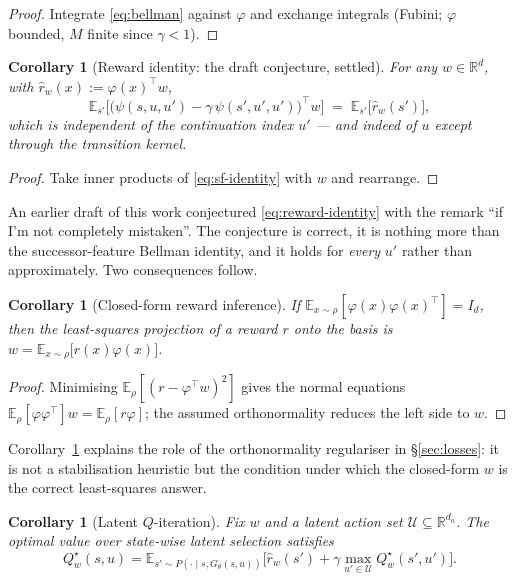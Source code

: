 \documentclass[11pt]{article}
\theoremstyle{plain}
\newtheorem{corollary}[lemma]{Corollary}
\theoremstyle{definition}
\theoremstyle{remark}
\newcommand{\R}{\mathbb R}
\newcommand{\E}{\mathbb E}
\newcommand{\1}{\mathbf 1}
\newcommand{\Gth}{G_\theta}
\begin{document}
\begin{proof}
Integrate \eqref{eq:bellman} against $\varphi$ and exchange integrals (Fubini; $\varphi$
bounded, $M$ finite since $\gamma<1$).
\end{proof}

\begin{corollary}[Reward identity: the draft conjecture, settled]
\label{cor:reward-identity}
For any $w\in\R^{d}$, with $\hat r_w(x):=\varphi(x)^\top w$,
\begin{equation}
\label{eq:reward-identity}
  \E_{s'}\Big[\big(\psi(s,u,u')-\gamma\,\psi(s',u',u')\big)^\top w\Big]
  \;=\;\E_{s'}\big[\hat r_w(s')\big],
\end{equation}
which is independent of the continuation index $u'$ --- and indeed of $u$ except through
the transition kernel.
\end{corollary}

\begin{proof}
Take inner products of \eqref{eq:sf-identity} with $w$ and rearrange.
\end{proof}

\noindent
An earlier draft of this work conjectured \eqref{eq:reward-identity} with the remark ``if
I'm not completely mistaken''. The conjecture is correct, it is nothing more than the
successor-feature Bellman identity, and it holds for \emph{every} $u'$ rather than
approximately. Two consequences follow.

\begin{corollary}[Closed-form reward inference]
\label{cor:reward-inference}
If $\E_{x\sim\rho}[\varphi(x)\varphi(x)^\top]=I_d$, then the least-squares projection of a
reward $r$ onto the basis is $w=\E_{x\sim\rho}\big[r(x)\varphi(x)\big]$.
\end{corollary}

\begin{proof}
Minimising $\E_\rho[(r-\varphi^\top w)^2]$ gives the normal equations
$\E_\rho[\varphi\varphi^\top]w=\E_\rho[r\varphi]$; the assumed orthonormality reduces the
left side to $w$.
\end{proof}

\noindent
Corollary~\ref{cor:reward-inference} explains the role of the orthonormality regulariser
in \S\ref{sec:losses}: it is not a stabilisation heuristic but the condition under which
the closed-form $w$ is the correct least-squares answer.

\begin{corollary}[Latent $Q$-iteration]
\label{cor:latent-q}
Fix $w$ and a latent action set $\mathcal U\subseteq\R^{d_a}$. The optimal value over
state-wise latent selection satisfies
\begin{equation}
\label{eq:latent-q}
  Q^\star_w(s,u)=\E_{s'\sim P(\cdot\mid s,\Gth(s,u))}
   \Big[\hat r_w(s')+\gamma\max_{u'\in\mathcal U}Q^\star_w(s',u')\Big].
\end{equation}
\end{corollary}
\end{document}

